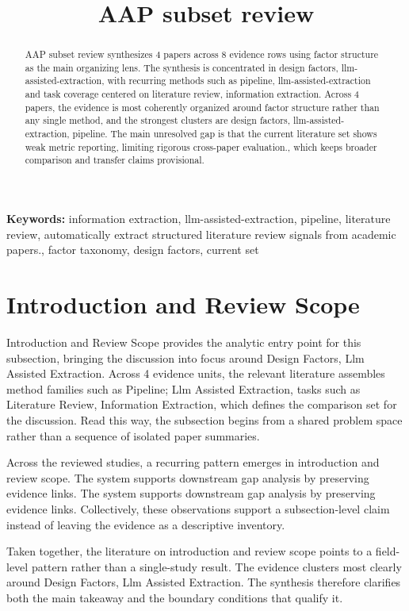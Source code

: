 \documentclass{article}
\title{AAP subset review}
\begin{document}
\maketitle
\begin{abstract}
AAP subset review synthesizes 4 papers across 8 evidence rows using factor structure as the main organizing lens. The synthesis is concentrated in design factors, llm-assisted-extraction, with recurring methods such as pipeline, llm-assisted-extraction and task coverage centered on literature review, information extraction. Across 4 papers, the evidence is most coherently organized around factor structure rather than any single method, and the strongest clusters are design factors, llm-assisted-extraction, pipeline. The main unresolved gap is that the current literature set shows weak metric reporting, limiting rigorous cross-paper evaluation., which keeps broader comparison and transfer claims provisional.
\end{abstract}
\noindent\textbf{Keywords:} information extraction, llm-assisted-extraction, pipeline, literature review, automatically extract structured literature review signals from academic papers., factor taxonomy, design factors, current set
\section{Introduction and Review Scope}
Introduction and Review Scope provides the analytic entry point for this subsection, bringing the discussion into focus around Design Factors, Llm Assisted Extraction. Across 4 evidence units, the relevant literature assembles method families such as Pipeline; Llm Assisted Extraction, tasks such as Literature Review, Information Extraction, which defines the comparison set for the discussion. Read this way, the subsection begins from a shared problem space rather than a sequence of isolated paper summaries. \cite{08_2016_zhou_aap,17_2017_chen_aap}

Across the reviewed studies, a recurring pattern emerges in introduction and review scope. The system supports downstream gap analysis by preserving evidence links. The system supports downstream gap analysis by preserving evidence links. Collectively, these observations support a subsection-level claim instead of leaving the evidence as a descriptive inventory. \cite{08_2016_zhou_aap,17_2017_chen_aap,09_2018_jiang_aap}

Taken together, the literature on introduction and review scope points to a field-level pattern rather than a single-study result. The evidence clusters most clearly around Design Factors, Llm Assisted Extraction. The synthesis therefore clarifies both the main takeaway and the boundary conditions that qualify it. \cite{08_2016_zhou_aap,17_2017_chen_aap}
\end{document}

